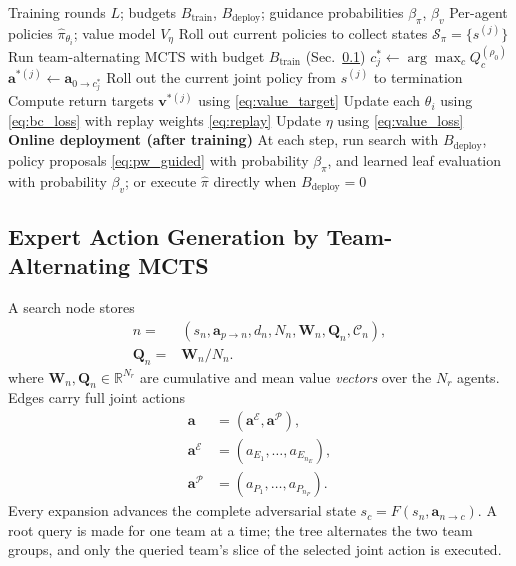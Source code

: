 \documentclass[letterpaper,10pt,conference]{ieeeconf}
\newcommand{\algcont}[1]{\Statex\hspace{\algorithmicindent}#1}
\begin{document}
\begin{algorithm}[t]
\caption{Search-Guided Policy Distillation (SGPD)}
\label{alg:sgpd}
\small
\begin{algorithmic}[1]
\Require Training rounds $L$; budgets $B_{\mathrm{train}}$,
\algcont{$B_{\mathrm{deploy}}$; guidance probabilities $\beta_\pi$, $\beta_v$}
\Ensure Per-agent policies $\hat\pi_{\theta_i}$; value model $V_\eta$
  \State Roll out current policies to collect states
  \algcont{$\mathcal{S}_\pi=\{s^{(j)}\}$}
    \State Run team-alternating MCTS
    \algcont{with budget $B_{\mathrm{train}}$ (Sec.~\ref{sec:expert})}
    \State $c_j^*\gets\arg\max_c Q_c^{(\rho_0)}$
    \State $\mathbf{a}^{*(j)}\gets\mathbf{a}_{0\to c_j^*}$
    \State Roll out the current joint policy
    \algcont{from $s^{(j)}$ to termination}
    \State Compute return targets $\mathbf{v}^{*(j)}$ using
    \algcont{\eqref{eq:value_target}}
  \EndFor
  \State Update each $\theta_i$ using \eqref{eq:bc_loss}
  \algcont{with replay weights \eqref{eq:replay}}
  \State Update $\eta$ using \eqref{eq:value_loss}
\EndFor
\Statex \textbf{Online deployment (after training)}
\State At each step, run search with $B_{\mathrm{deploy}}$,
\algcont{policy proposals \eqref{eq:pw_guided} with probability $\beta_\pi$,}
\algcont{and learned leaf evaluation with probability $\beta_v$;}
\algcont{or execute $\hat\pi$ directly when $B_{\mathrm{deploy}}=0$}
\end{algorithmic}
\end{algorithm}

\subsection{Expert Action Generation by Team-Alternating MCTS}
\label{sec:expert}

A search node stores
\begin{equation}
\begin{aligned}
n={}&(s_n,\mathbf a_{p\to n},d_n,N_n,
       \mathbf W_n,\mathbf Q_n,\mathcal C_n),\\
\mathbf Q_n={}&\mathbf W_n/N_n .
\end{aligned}
\end{equation}
where $\mathbf W_n,\mathbf Q_n\in\mathbb R^{N_r}$ are cumulative and
mean value \emph{vectors} over the $N_r$ agents.
Edges carry full joint actions
\begin{equation}
\begin{aligned}
\mathbf a&=(\mathbf a^{\mathcal E},\mathbf a^{\mathcal P}),\\
\mathbf a^{\mathcal E}&=(a_{E_1},\ldots,a_{E_{n_E}}),\\
\mathbf a^{\mathcal P}&=(a_{P_1},\ldots,a_{P_{n_P}}).
\end{aligned}
\end{equation}
Every expansion advances the complete adversarial state
$s_c=F(s_n,\mathbf{a}_{n\to c})$. A root query is made for one team at
a time; the tree alternates the two team groups, and only the queried
team's slice of the selected joint action is executed.
\end{document}
